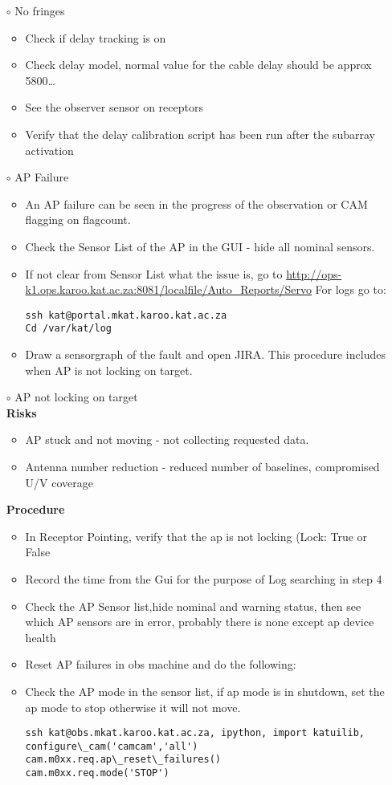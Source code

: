 \begin{itemize}
\begin{itemize}
\item[$\circ$] No fringes
\begin{itemize}
\item Check if delay tracking is on
\item Check delay model, normal value for the cable delay should be approx 5800…
\item See the observer sensor on receptors
\item Verify that the delay calibration script has been run after the subarray activation
\end{itemize}

\item[$\circ$] AP Failure
\begin{itemize}
\item An AP failure can be seen in the progress of the observation or CAM flagging on flagcount.
\item Check the Sensor List of the AP in the GUI - hide all nominal sensors.
\item If not clear from Sensor List what the issue is, go to \url{http://ops-k1.ops.karoo.kat.ac.za:8081/localfile/Auto\_Reports/Servo}
For logs go to:
\begin{lstlisting}[style=DOS]
ssh kat@portal.mkat.karoo.kat.ac.za
Cd /var/kat/log
\end{lstlisting}

\item Draw a sensorgraph of the fault and open JIRA.
This procedure includes when AP is not locking on target.
\end{itemize}
\item[$\circ$] AP not locking on target\\
\textbf{Risks}
\begin{itemize}
\item AP stuck and not moving - not collecting requested data.
\item Antenna number reduction - reduced number of baselines, compromised U/V coverage
\end{itemize}                                  
\textbf{Procedure}
\begin{itemize}
 \item In Receptor Pointing, verify that the ap is not locking (Lock: True or False
\item Record the time from the Gui for the purpose of Log searching in step 4
\item Check the AP Sensor list,hide nominal and warning status, then see which AP sensors are in error, probably there is none except ap device health
\item Reset AP failures in obs machine and do the following:
\item Check the AP mode in the sensor list, if ap mode is in shutdown, set the ap mode to stop otherwise it will not move.
\begin{lstlisting}[style=DOS]
ssh kat@obs.mkat.karoo.kat.ac.za, ipython, import katuilib, 
configure\_cam('camcam','all')
cam.m0xx.req.ap\_reset\_failures()
cam.m0xx.req.mode('STOP')
\end{lstlisting}


\end{itemize}
\end{itemize}
\end{itemize}
